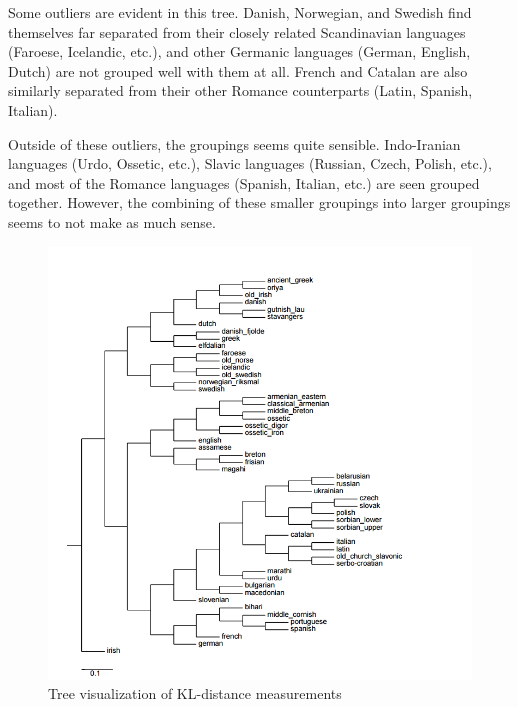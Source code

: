\documentclass[10pt,a4]{article}
\begin{document}
Some outliers are evident in this tree.  Danish, Norwegian, and Swedish find themselves far separated from their closely related Scandinavian languages (Faroese, Icelandic, etc.), and other Germanic languages (German, English, Dutch) are not grouped well with them at all.  French and Catalan are also similarly separated from their other Romance counterparts (Latin, Spanish, Italian).

Outside of these outliers, the groupings seems quite sensible.  Indo-Iranian languages (Urdo, Ossetic, etc.), Slavic languages (Russian, Czech, Polish, etc.), and most of the Romance languages (Spanish, Italian, etc.) are seen grouped together.  However, the combining of these smaller groupings into larger groupings seems to not make as much sense.

	
\begin{figure}[ht] 
	\centering 
	\includegraphics[width=\linewidth]{tree1(3)}
	\caption{Tree visualization of KL-distance measurements}
	\label{fig:kltree}
\end{figure}
\end{document}
